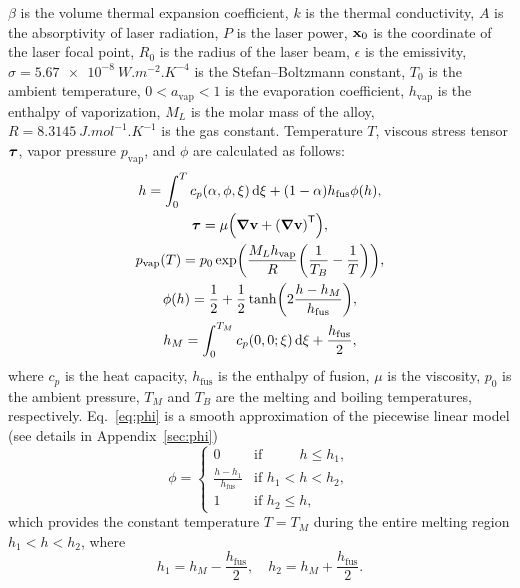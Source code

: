 \documentclass{article}
\newcommand{\tran}{\mathsf{T}} %
\newcommand{\fusion}[1]{{#1}_\mathrm{fus}}
\newcommand{\evapor}[1]{{#1}_\mathrm{vap}}
\newcommand{\bv}{\vb{v}}
\newcommand{\bx}{\vb{x}}
\newcommand{\btau}{\vb*\tau}
\begin{document}
$\beta$ is the volume thermal expansion coefficient,
$k$ is the thermal conductivity, $A$ is the absorptivity of laser radiation,
$P$ is the laser power, $\bx_0$ is the coordinate of the laser focal point,
$R_0$ is the radius of the laser beam, $\epsilon$ is the emissivity,
$\sigma=\SI{5.67e-8}{W.m^{-2}.K^{-4}}$ is the Stefan--Boltzmann constant,
$T_0$ is the ambient temperature,
$0 < \evapor{a} < 1$ is the evaporation coefficient,
$\evapor{h}$ is the enthalpy of vaporization,
$M_L$ is the molar mass of the alloy,
$R = \SI{8.3145}{J.mol^{-1}.K^{-1}}$ is the gas constant.
Temperature $T$, viscous stress tensor $\btau$, vapor pressure $\evapor{p}$,
and $\phi$ are calculated as follows:
\begin{gather}
    h = \int_0^T c_p(\alpha,\phi,\xi)\dd{\xi} + (1-\alpha)\fusion{h}\phi(h), \label{eq:T}\\
    \btau = \mu\qty(\grad\bv + \qty(\grad\bv)^\tran), \label{eq:tau}\\
    \evapor{p}(T) = p_0\exp(\frac{M_L\evapor{h}}{R}\qty(\frac1{T_B}-\frac1{T})), \label{eq:p_evapor}\\
    \phi(h) = \frac12 + \frac12\tanh(2\frac{h-h_M}{\fusion{h}}), \label{eq:phi}\\
    h_M = \int_0^{T_M} c_p(0,0;\xi)\dd{\xi} + \frac{\fusion{h}}2, \label{eq:h_M}
\end{gather}
where $c_p$ is the heat capacity,
$\fusion{h}$ is the enthalpy of fusion, $\mu$ is the viscosity,
$p_0$ is the ambient pressure,
$T_M$ and $T_B$ are the melting and boiling temperatures, respectively.
Eq.~\eqref{eq:phi} is a smooth approximation of the piecewise linear model
(see details in Appendix~\ref{sec:phi})
\begin{equation}\label{eq:phi_piecewise}
    \phi = \begin{cases}
        0                        &\text{if }\qquad\,\, h \leq h_1, \\
        \frac{h-h_1}{\fusion{h}} &\text{if } h_1 < h < h_2, \\
        1                        &\text{if } h_2 \leq h,
    \end{cases}
\end{equation}
which provides the constant temperature $T=T_M$ during the entire melting region $h_1<h<h_2$,
where
\begin{equation}\label{eq:enthalpySL}
    h_1 = h_M - \frac{\fusion{h}}2, \quad h_2 = h_M + \frac{\fusion{h}}2.
\end{equation}
\end{document}
